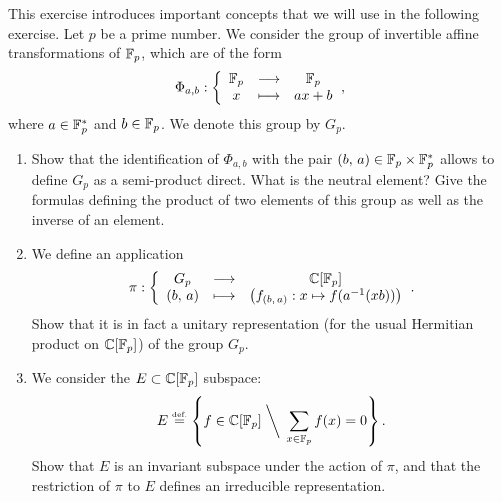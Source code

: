  
\begin{exo}
\label{exo-group-affine-finite-body}
 
This exercise introduces important concepts that we will use in the following exercise. Let $ p $ be a prime number. We consider the group of invertible affine transformations of $ \mathbb{F}_p $, which are of the form
\begin{equation*}
\Phi_{a, b}: {\left\{ \begin{array}{ccc} \mathbb{F}_p & \longrightarrow & \mathbb{F}_p \\ x & \longmapsto & ax + b \end{array} \right.},
\end{equation*}
where $ a \in \mathbb{F}_p^* $ and $ b \in \mathbb{F}_p $. We denote this group by $ G_p $. \begin{enumerate}
\item Show that the identification of $ \Phi_{a, b} $ with the pair $ (b, \, a) \in \mathbb{F}_p \times \mathbb{F}_p^* $ allows to define $ G_p $ as a semi-product direct. What is the neutral element? Give the formulas defining the product of two elements of this group as well as the inverse of an element.
\item We define an application
\begin{equation*}
\pi: {\left\{ \begin{array}{ccc} G_p & \longrightarrow & \mathbb{C} [\mathbb{F}_p] \\ (b, \, a) & \longmapsto & \left(f_{(b, \, a)}: x \mapsto f(a^{- 1 } (xb)) \right) \end{array} \right.}.
\end{equation*}
Show that it is in fact a unitary representation (for the usual Hermitian product on $ \mathbb{C} [\mathbb{F}_p] $) of the group $ G_p $.
\item We consider the $ E \subset \mathbb{C} [\mathbb{F}_p] $ subspace:
\begin{equation}
\label{eq-defn-affine-space-ss-space-E}
E \stackrel{\mbox{\upshape\tiny def.}}{=} \left\{f \in \mathbb{C} [\mathbb{F}_p] \; \bigg \backslash \; \sum_{x \in \mathbb{F}_p}{f(x) = 0} \right\}.
\end{equation}
Show that $ E $ is an invariant subspace under the action of $ \pi $, and that the restriction of $ \pi $ to $ E $ defines an irreducible representation.
\end{enumerate}
\end{exo}
 

